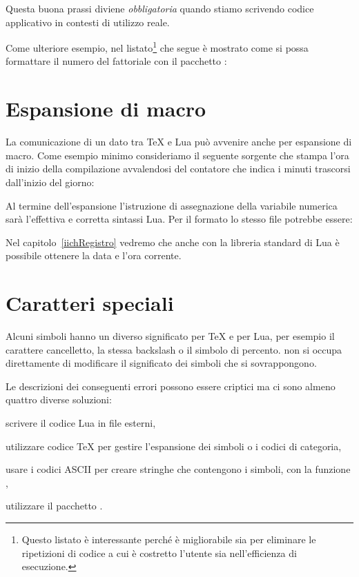 Questa buona prassi diviene \emph{obbligatoria} quando stiamo scrivendo codice
applicativo in contesti di utilizzo reale.

Come ulteriore esempio, nel listato\footnote{Questo listato è interessante
perché è migliorabile sia per eliminare le ripetizioni di codice a cui è
costretto l'utente sia nell'efficienza di esecuzione.} che segue è mostrato come
si possa formattare il numero del fattoriale con il pacchetto
: 


\section{Espansione di macro}

La comunicazione di un dato tra \TeX{} e Lua può avvenire anche per espansione
di macro. Come esempio minimo consideriamo il seguente sorgente \LuaTeX{} che
stampa l'ora di inizio della compilazione avvalendosi del contatore 
che indica i minuti trascorsi dall'inizio del giorno:

Al termine dell'espansione l'istruzione di assegnazione della variabile numerica
 sarà l'effettiva e corretta sintassi Lua. Per il formato \LuaLaTeX{}
lo stesso file potrebbe essere:

Nel capitolo~\ref{iichRegistro} vedremo che anche con la libreria standard di
Lua è possibile ottenere la data e l'ora corrente.


\section{Caratteri speciali}

Alcuni simboli hanno un diverso significato per \TeX{} e per Lua, per esempio il
carattere cancelletto, la stessa backslash o il simbolo di percento. \LuaTeX{}
non si occupa direttamente di modificare il significato dei simboli che si
sovrappongono.

Le descrizioni dei conseguenti errori possono essere criptici ma ci sono almeno
quattro diverse soluzioni:
\begin{compactitemize}
\item scrivere il codice Lua in file esterni,
\item utilizzare codice \TeX{} per gestire l'espansione dei simboli o i codici
di categoria,
\item usare i codici ASCII per creare stringhe che contengono i simboli, con la
funzione ,
\item utilizzare il pacchetto .
\end{compactitemize}

